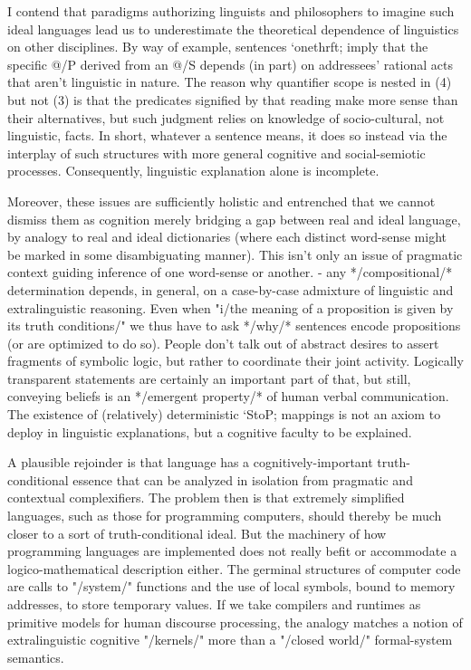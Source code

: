 I contend that paradigms authorizing linguists and philosophers to 
imagine such ideal languages lead us 
to underestimate the theoretical dependence of linguistics 
on other disciplines.  By way of example, sentences `onethrft; imply 
that the specific @/P derived from an @/S 
depends (in part) on addressees' rational acts that aren't linguistic 
in nature.  The reason why quantifier scope is nested in (4) but not (3) is that 
the predicates signified by that reading make more sense than their 
alternatives, but such judgment relies on knowledge of socio-cultural, not 
linguistic, facts.  In short, whatever a sentence means, it does so 
instead via the interplay of such structures with more general cognitive 
and social-semiotic processes.  Consequently, linguistic 
explanation alone is incomplete.  

Moreover, these issues are sufficiently 
holistic and entrenched that we cannot dismiss them as cognition   
merely bridging a gap between real and ideal language, by analogy to 
real and ideal dictionaries (where each distinct word-sense might 
be marked in some disambiguating manner).  This isn't only an 
issue of pragmatic context guiding inference of one word-sense 
or another.  -%
any */compositional/* determination depends, in general, 
on a case-by-case admixture of linguistic and extralinguistic reasoning. 
Even when "i/the meaning of a 
proposition is given by its truth 
conditions/" we thus have to ask */why/* sentences encode propositions (or 
are optimized to do so).  People don't talk out of abstract desires 
to assert fragments of symbolic logic, but rather to coordinate their joint 
activity.  Logically transparent statements are certainly an 
important part of that, but still, conveying beliefs 
is an */emergent property/* of human verbal communication.  
The existence of (relatively) deterministic `StoP; mappings is not an axiom to 
deploy in linguistic explanations, but a cognitive faculty to be explained.

A plausible rejoinder is that language has a cognitively-important 
truth-conditional essence that can be analyzed in isolation from 
pragmatic and contextual complexifiers.  The problem then is that 
extremely simplified languages, such as those for programming 
computers, should thereby be much closer to a sort of truth-conditional ideal.  
But the machinery of how programming languages are implemented does not 
really befit or accommodate a logico-mathematical description either.  The germinal 
structures of computer code are calls to "/system/" functions and 
the use of local symbols, bound to memory addresses, to store 
temporary values.  If we take compilers and runtimes as 
primitive models for human discourse processing, the analogy 
matches a notion of extralinguistic cognitive "/kernels/" more 
than a "/closed world/" formal-system semantics.  

